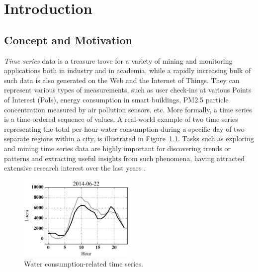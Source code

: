 
\chapter{Introduction} \label{chap:intro}

\section{Concept and Motivation}
\label{subsec:conept_motivation}

\textit{Time series} data is a treasure trove for a variety of mining and monitoring applications both in industry and in academia, while a rapidly increasing bulk of such data is also generated on the Web and the Internet of Things. They can represent various types of measurements, such as user check-ins at various Points of Interest (PoIs), energy consumption in smart buildings, PM2.5 particle concentration measured by air pollution sensors, etc. More formally, a time series is a time-ordered sequence of values. A real-world example of two time series representing the total per-hour water consumption during a specific day of two separate regions within a city, is illustrated in Figure~\ref{fig:ts_example}. Tasks such as exploring and mining time series data are highly important for discovering trends or patterns and extracting useful insights from such phenomena, having attracted extensive research interest over the last years \cite{DBLP:journals/pvldb/EchihabiZPB18,DBLP:conf/sigmod/LinardiZPK18a,DBLP:journals/datamine/YehZUBDDZSMK18,camerra2014kais,ding2008pvldb,shieh2008kdd}.

\begin{figure}[tb]
 \centering
 \includegraphics[width=0.5\textwidth]{water_ts.png}
\caption{Water consumption-related time series.}
\label{fig:ts_example}
\end{figure}

